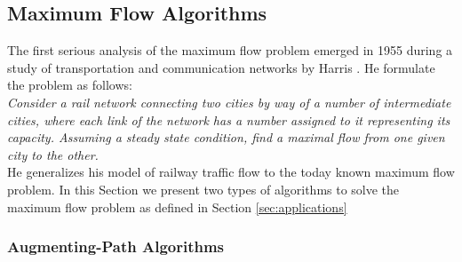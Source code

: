 
\subsection{Maximum Flow Algorithms}
\label{sec:max_flow}

The first serious analysis of the maximum flow problem emerged in 1955 during 
a study of transportation and communication networks by Harris \cite{harris1955}. 
He formulate the problem as follows: \\
\emph{Consider a rail network connecting two cities by way of a number of
intermediate cities, where each link of the network has a number assigned to
it representing its capacity. Assuming a steady state condition, find a maximal
flow from one given city to the other.} \\
He generalizes his model of railway traffic flow to the today known maximum 
flow problem. In this Section we present two types of algorithms to solve the
maximum flow problem as defined in Section \ref{sec:applications}

\subsubsection{Augmenting-Path Algorithms}
\label{sec:aug_path}

